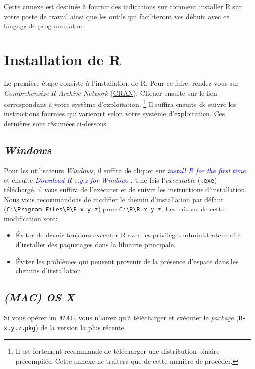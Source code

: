 Cette annexe est destinée à fournir des indications sur comment installer R sur votre poste de travail ainsi que les outils qui faciliteront vos débuts avec ce langage de programmation. 

\section{Installation de R}
Le première étape consiste à l'installation de R. Pour ce faire, rendez-vous sur \emph{Comprehensize R Archive Network} (\href{https://cran.r-project.org/}{CRAN}). Cliquer ensuite sur le lien correspondant à votre système d'exploitation. \footnote{Il est fortement recommandé de télécharger une distribution binaire précompilée. Cette annexe ne traitera que de cette manière de procéder.} Il suffira ensuite de suivre les instructions fournies qui varieront selon votre système d'exploitation. Ces dernières sont résumées ci-dessous.

\subsection{\emph{Windows}}
Pour les utilisateurs \emph{Windows}, il suffira de cliquer sur \textcolor{blue}{\emph{install R for the first time}} et ensuite \textcolor{blue}{\emph{Download R x.y.z for Windows }}. Une fois l'\emph{executable} (\texttt{.exe}) téléchargé, il vous suffira de l'exécuter et de suivre les instructions d'installation. \\

Nous vous recommandons de modifier le chemin d'installation par défaut \newline (\verb|C:\Program Files\R\R-x.y.z|) pour \verb|C:\R\R-x.y.z|. Les raisons de cette modification sont:
\begin{itemize}
	\item Éviter de devoir toujours exécuter R avec les privilèges administrateur afin d'installer des paquetages dans la librairie principale.
	\item Éviter les problèmes qui peuvent provenir de la présence d'espace dans les chemins d'installation.
\end{itemize}

\subsection{\emph{(MAC) OS X}}
Si vous opérer un \emph{MAC}, vous n'aurez qu'à télécharger et exécuter le \emph{package} (\verb|R-x.y.z.pkg|) de la version la plus récente. 

